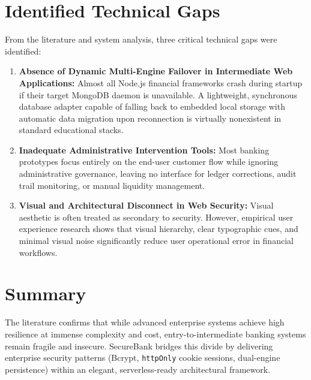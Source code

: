 \section{Identified Technical Gaps}
From the literature and system analysis, three critical technical gaps were identified:
\begin{enumerate}
    \item \textbf{Absence of Dynamic Multi-Engine Failover in Intermediate Web Applications:} Almost all Node.js financial frameworks crash during startup if their target MongoDB daemon is unavailable. A lightweight, synchronous database adapter capable of falling back to embedded local storage with automatic data migration upon reconnection is virtually nonexistent in standard educational stacks.
    \item \textbf{Inadequate Administrative Intervention Tools:} Most banking prototypes focus entirely on the end-user customer flow while ignoring administrative governance, leaving no interface for ledger corrections, audit trail monitoring, or manual liquidity management.
    \item \textbf{Visual and Architectural Disconnect in Web Security:} Visual aesthetic is often treated as secondary to security. However, empirical user experience research shows that visual hierarchy, clear typographic cues, and minimal visual noise significantly reduce user operational error in financial workflows.
\end{enumerate}

\section{Summary}
The literature confirms that while advanced enterprise systems achieve high resilience at immense complexity and cost, entry-to-intermediate banking systems remain fragile and insecure. SecureBank bridges this divide by delivering enterprise security patterns (Bcrypt, \texttt{httpOnly} cookie sessions, dual-engine persistence) within an elegant, serverless-ready architectural framework.
